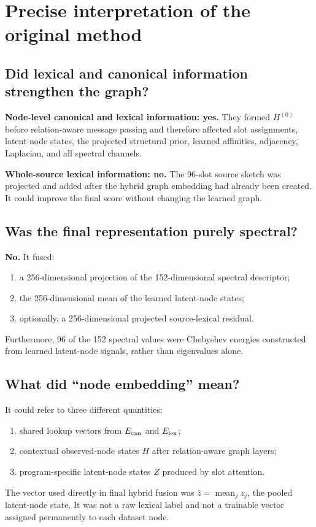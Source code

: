 \documentclass[11pt,a4paper]{article}
\newcommand{\mean}{\operatorname{mean}}
\begin{document}
\section{Precise interpretation of the original method}

\subsection{Did lexical and canonical information strengthen the graph?}

\textbf{Node-level canonical and lexical information: yes.}
They formed $H^{(0)}$ before relation-aware message passing and therefore affected
slot assignments, latent-node states, the projected structural prior, learned
affinities, adjacency, Laplacian, and all spectral channels.

\textbf{Whole-source lexical information: no.}
The 96-slot source sketch was projected and added after the hybrid graph embedding
had already been created. It could improve the final score without changing the
learned graph.

\subsection{Was the final representation purely spectral?}

\textbf{No.} It fused:
\begin{enumerate}
\item a 256-dimensional projection of the 152-dimensional spectral descriptor;
\item the 256-dimensional mean of the learned latent-node states;
\item optionally, a 256-dimensional projected source-lexical residual.
\end{enumerate}
Furthermore, 96 of the 152 spectral values were Chebyshev energies constructed
from learned latent-node signals, rather than eigenvalues alone.

\subsection{What did ``node embedding'' mean?}

It could refer to three different quantities:
\begin{enumerate}
\item shared lookup vectors from $E_{\rm can}$ and $E_{\rm lex}$;
\item contextual observed-node states $H$ after relation-aware graph layers;
\item program-specific latent-node states $Z$ produced by slot attention.
\end{enumerate}
The vector used directly in final hybrid fusion was $\bar z=\mean_jz_j$, the pooled
latent-node state. It was not a raw lexical label and not a trainable vector
assigned permanently to each dataset node.
\end{document}
